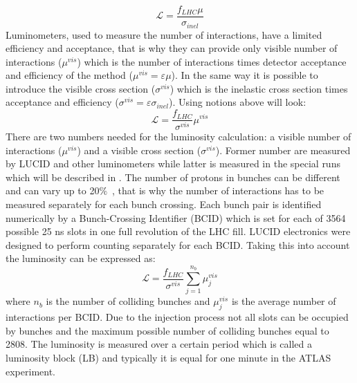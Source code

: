 \begin{equation}
\mathscr{L} = \dfrac{f_{LHC} \mu}{\sigma_{inel}}
\label{eq:lumi_average_mu}
\end{equation}
Luminometers, used to measure the number of interactions, have a limited efficiency and acceptance, 
that is why they can provide only visible number of interactions ($\mu^{vis}$) which is the number of interactions 
times detector acceptance and efficiency of the method ($\mu^{vis} = \varepsilon \mu$).
In the same way it is possible to introduce the visible cross section ($\sigma^{vis}$) which is the inelastic 
cross section times acceptance and efficiency ($\sigma^{vis} = \varepsilon \sigma_{inel}$).
Using notions above  will look:
\begin{equation}
\mathscr{L} = \dfrac{f_{LHC}}{\sigma^{vis}} \mu^{vis}
\label{eq:lumi_bunch_sum_visible}
\end{equation}
There are two numbers needed for the luminosity calculation: a visible number of interactions ($\mu^{vis}$) and a visible cross section ($\sigma^{vis}$). 
Former number are measured by LUCID and other luminometers while latter is measured in the special runs which will be described in . 
The number of protons in bunches can be different and can vary up to 20$\%$~\cite{Aad:2013ucp}, that is why the number of interactions has to be measured separately for each bunch crossing. Each bunch pair is identified numerically by a Bunch-Crossing Identifier (BCID) which is set for each of 3564 possible 25 ns slots in one full revolution of the LHC fill.
LUCID electronics were designed to perform counting separately for each BCID. 
Taking this into account the luminosity can be expressed as:
\begin{equation}
\mathscr{L} = \dfrac{f_{LHC}}{\sigma^{vis}} \sum_{j=1}^{n_{b}} \mu_{j}^{vis}
\label{eq:lumi_bunch_sum}
\end{equation}
where $n_{b}$ is the number of colliding bunches and $\mu_{j}^{vis}$ is the average number of interactions per BCID.
Due to the injection process not all slots can be occupied by bunches and the maximum possible number of colliding bunches equal to 2808.
The luminosity is measured over a certain period which is called a luminosity block (LB) and typically it is equal for one minute in the ATLAS experiment. 

